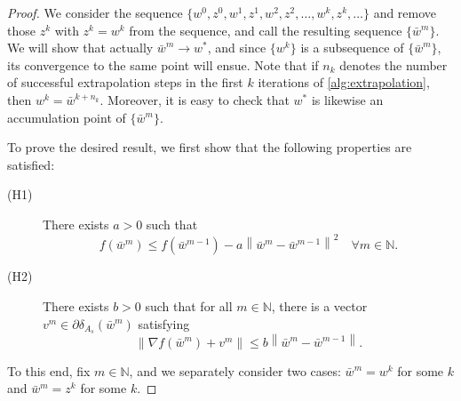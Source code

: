 \documentclass{article}
\theoremstyle{plain}
\theoremstyle{definition}
\theoremstyle{remark}
\newcommand{\norm}[1]{{\left\|{#1}\right\|}}
\begin{document}
\begin{proof}
	We consider the sequence $\{w^0, z^0, w^1, z^1, w^2,z^2, \dotsc,
	w^k,z^k , \dotsc \}$ and remove those $z^k$ with $z^k = w^k$ from
	the sequence, and call the resulting sequence 
	$\{\bar{w}^m\}$. We will show that actually $\bar{w}^m \rightarrow
	w^*$, and since $\{w^k\}$ is a subsequence of $\{\bar{w}^m\}$, its
	convergence to the same point will ensue.
	Note that if $n_k$ denotes the number of successful 
	extrapolation steps in the first $k$ iterations of
	\cref{alg:extrapolation}, then $w^k=\bar{w}^{k+n_k}$. Moreover, 
	it is easy to check that $w^*$ is likewise an accumulation point of 
	$\{\bar{w}^m\}$. 
	
	To prove 
	the desired result, we first show that the following properties are 
	satisfied:
	\begin{description}
		\item[(H1)] There exists $a>0$ such that 
			\begin{equation}
			\label{eq:H1}
			f(\bar{w}^{m}) \leq f(\bar{w}^{m-1}) - 
			a\norm{\bar{w}^{m}-\bar{w}^{m-1}}^2 \quad \forall m\in 
			\mathbb{N}.
			\end{equation}
		\item[(H2)] There exists $b>0$ such that for all $m\in \mathbb{N}$, 
		there is a vector $v^{m} \in \partial \delta_{A_s} (\bar{w}^{m})$ 
		satisfying 
			\begin{equation}
			\label{eq:H2}
			\norm{\nabla f(\bar{w}^m) + v^m} \leq b 
			\norm{\bar{w}^{m}-\bar{w}^{m-1}}.
			\end{equation}	
	\end{description}
	To this end, fix $m\in \mathbb{N}$, and we separately consider two cases:
	$\bar{w}^m = w^k$ for some $k$ and $\bar{w}^m = z^k$ for some $k$.


\end{proof}
\end{document}
